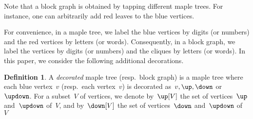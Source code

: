 \documentclass{amsart}
\theoremstyle{definition}
\newtheorem{definition}[theorem]{Definition}
\newcommand{\darkblue}{\color{darkblue}} %
\newcommand{\defn}[1]{\textsl{\darkblue #1}} %
\begin{document}
Note that a block graph is obtained by tapping different maple trees. For instance, one can arbitrarily add red leaves to the blue vertices.

For convenience, in a maple tree, we label the blue vertices by digits (or numbers) and the red vertices by letters (or words).
Consequently, in a block graph, we label the vertices by digits (or numbers) and the cliques by letters (or words).
In this paper, we consider the following additional decorations.

\begin{definition}
  A \defn{decorated} maple tree (resp.~block graph) is a maple tree where each blue vertex~$v$ (resp.~each vertex~$v$) is decorated as~$v, \up, \down$ or~$\updown$.
  For a subset~$V$ of vertices, we denote by~$\up[V]$ the set of vertices~$\up$ and~$\updown$ of~$V$, and by~$\down[V]$ the set of vertices~$\down$ and~$\updown$ of~$V$
\end{definition}
\end{document}
